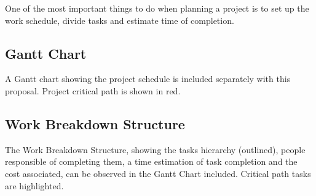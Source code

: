 
One of the most important things to do when
planning a project is to set up the work schedule, divide tasks and estimate
time of completion.

\subsection{Gantt Chart}

A Gantt chart showing the project schedule is included
separately with this proposal. Project critical path is shown in red.

\subsection{Work Breakdown Structure}

The Work Breakdown Structure, showing the
tasks hierarchy (outlined), people responsible  of completing them, a time
estimation of task completion and  the cost associated, can be observed in the
Gantt Chart included. Critical path tasks are highlighted.
